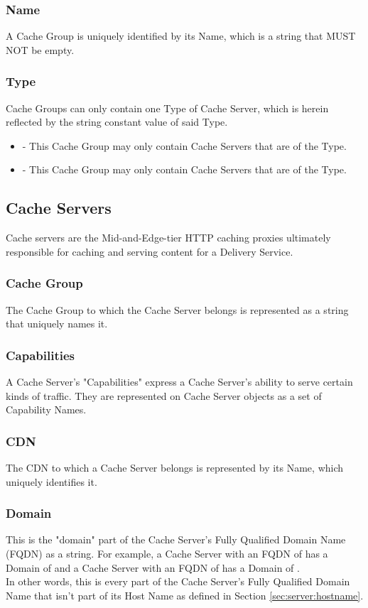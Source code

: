 \subsubsection{Name}
A Cache Group is uniquely identified by its Name, which is a string that MUST
NOT be empty.

\subsubsection{Type}
Cache Groups can only contain one Type of Cache Server, which is herein
reflected by the string constant value of said Type.

\begin{itemize}
	\item {} - This Cache Group may only contain Cache Servers that
		are of the  Type.
	\item {} - This Cache Group may only contain Cache Servers that are
		of the  Type.
\end{itemize}

\subsection{Cache Servers}
Cache servers are the Mid-and-Edge-tier HTTP caching proxies ultimately
responsible for caching and serving content for a Delivery Service.

\subsubsection{Cache Group}
The Cache Group to which the Cache Server belongs is represented as a string
that uniquely names it.

\subsubsection{Capabilities}
A Cache Server's "Capabilities" express a Cache Server's ability to serve
certain kinds of traffic. They are represented on Cache Server objects as a set
of Capability Names.

\subsubsection{CDN}
The CDN to which a Cache Server belongs is represented by its Name, which
uniquely identifies it.

\subsubsection{Domain\label{sec:server:domain}}
This is the "domain" part of the Cache Server's Fully Qualified Domain Name
(FQDN) as a string. For example, a Cache Server with an FQDN of
 has a Domain of  and a Cache Server with an FQDN of
 has a Domain of .\\
In other words, this is every part of the Cache Server's Fully Qualified Domain
Name that isn't part of its Host Name as defined in Section
\ref{sec:server:hostname}.

